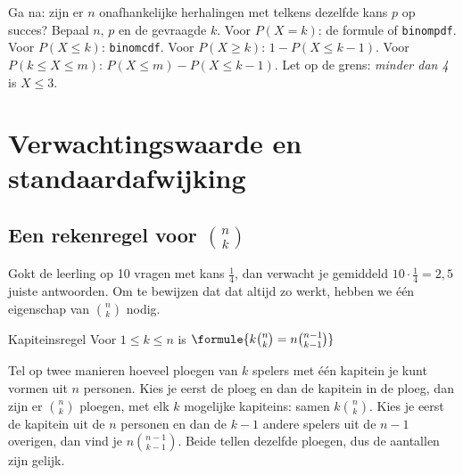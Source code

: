 
\begin{werkwijze}
Ga na: zijn er $n$ onafhankelijke herhalingen met telkens dezelfde kans $p$ op succes? Bepaal $n$, $p$ en de gevraagde $k$. Voor $P(X = k)$: de formule of \texttt{binompdf}. Voor $P(X \leqslant k)$: \texttt{binomcdf}. Voor $P(X \geqslant k)$: $1 - P(X \leqslant k - 1)$. Voor $P(k \leqslant X \leqslant m)$: $P(X \leqslant m) - P(X \leqslant k - 1)$. Let op de grens: \textit{minder dan 4} is $X \leqslant 3$.
\end{werkwijze}

\begin{oefeningen}

\end{oefeningen}

\section{Verwachtingswaarde en standaardafwijking}

\subsection{Een rekenregel voor $\binom{n}{k}$}

Gokt de leerling op 10 vragen met kans $\frac14$, dan verwacht je gemiddeld $10 \cdot \frac14 = 2{,}5$ juiste antwoorden. Om te bewijzen dat dat altijd zo werkt, hebben we één eigenschap van $\binom{n}{k}$ nodig.

\begin{theorie}
\begin{stelling}{Kapiteinsregel}
Voor $1 \leqslant k \leqslant n$ is \quad $\formule{k \binom{n}{k} = n \binom{n - 1}{k - 1}}$
\end{stelling}

\begin{bewijs}
Tel op twee manieren hoeveel ploegen van $k$ spelers met één kapitein je kunt vormen uit $n$ personen. Kies je eerst de ploeg en dan de kapitein in de ploeg, dan zijn er $\binom{n}{k}$ ploegen, met elk $k$ mogelijke kapiteins: samen $k\binom{n}{k}$. Kies je eerst de kapitein uit de $n$ personen en dan de $k - 1$ andere spelers uit de $n - 1$ overigen, dan vind je $n \binom{n - 1}{k - 1}$. Beide tellen dezelfde ploegen, dus de aantallen zijn gelijk.
\end{bewijs}
\end{theorie}


